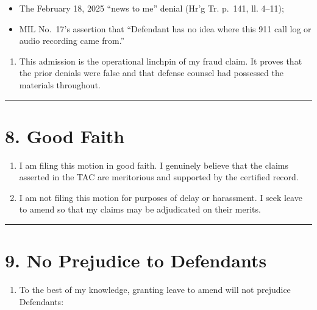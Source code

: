 \begin{itemize}
\tightlist
\item
  The February 18, 2025 ``news to me'' denial (Hr'g Tr. p.~141, ll. 4--11);
\item
  MIL No.~17's assertion that ``Defendant has no idea where this 911 call log or audio recording came from.''
\end{itemize}

\begin{enumerate}
\def\labelenumi{\arabic{enumi}.}
\setcounter{enumi}{18}
\tightlist
\item
  This admission is the operational linchpin of my fraud claim. It proves that the prior denials were false and that defense counsel had possessed the materials throughout.
\end{enumerate}

\begin{center}\rule{0.5\linewidth}{0.5pt}\end{center}

\section{8. Good Faith}\label{good-faith}

\begin{enumerate}
\def\labelenumi{\arabic{enumi}.}
\setcounter{enumi}{19}
\item
  I am filing this motion in good faith. I genuinely believe that the claims asserted in the TAC are meritorious and supported by the certified record.
\item
  I am not filing this motion for purposes of delay or harassment. I seek leave to amend so that my claims may be adjudicated on their merits.
\end{enumerate}

\begin{center}\rule{0.5\linewidth}{0.5pt}\end{center}

\section{9. No Prejudice to Defendants}\label{no-prejudice-to-defendants}

\begin{enumerate}
\def\labelenumi{\arabic{enumi}.}
\setcounter{enumi}{21}
\tightlist
\item
  To the best of my knowledge, granting leave to amend will not prejudice Defendants:
\end{enumerate}

